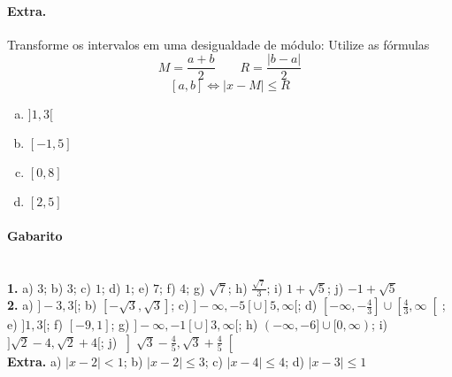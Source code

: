 \documentclass[a4paper,twocolumn,12pt]{article}
\begin{document}
\paragraph*{Extra.} Transforme os intervalos em uma desigualdade de módulo:
Utilize as fórmulas
$$M = \frac{a+b}{2} \qquad R = \frac{|b-a|}{2}$$
$$[a, b] \Leftrightarrow |x-M| \le R$$
\begin{enumerate}[a)]
\item $]1, 3[$
\item $[-1, 5]$
\item $[0, 8]$
\item $[2,5]$ 
\end{enumerate}
 

  \vfill
  {\footnotesize\color{darkgray}
    \paragraph*{Gabarito} \hspace*{\fill}\\
    \textbf{1.} a) $3$; b) $3$; c) $1$; d) $1$; e) $7$; f) $4$; g) $\sqrt{7}$; h) $\frac{\sqrt{7}}{3}$; i) $1+\sqrt{5}$; j) $-1+\sqrt{5}$\\
    \textbf{2.} a) $]-3,3[$; b) $\left[-\sqrt{3},\sqrt{3}\right]$; c) $]-\infty,-5[\cup]5,\infty[$; d) $\left[-\infty,-\frac{4}{3}\right]\cup\left[\frac{4}{3},\infty\right[$; e) $]1,3[$; f) $[-9,1]$; g) $]-\infty,-1[\cup]3,\infty[$; h) $(-\infty,-6]\cup [0,\infty)$; i) $]\sqrt{2}-4,\sqrt{2}+4[$; j) $\left]\sqrt{3} - \frac{4}{5}, \sqrt{3} + \frac{4}{5} \right[$\\
    \textbf{Extra.} a) $|x-2|<1$; b) $|x-2| \le 3$; c) $|x-4| \le 4$; d) $|x-3| \le 1$
  }
\end{document}
